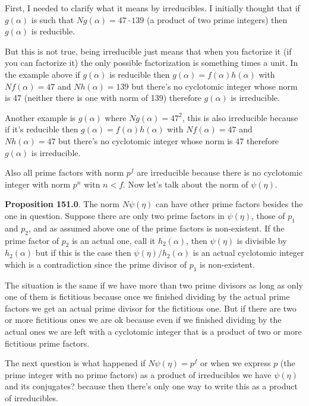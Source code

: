 \documentclass[aps,preprint,preprintnumbers,nofootinbib,showpacs,prd]{revtex4-1}
\begin{document}
First, I needed to clarify what it means by irreducibles. I initially thought that if $g(\alpha)$ is such that $Ng(\alpha) = 47 \cdot 139$ (a product of two prime integers) then $g(\alpha)$ is reducible.

But this is not true, being irreducible just means that when you factorize it (if you can factorize it) the only possible factorization is something times a unit. In the example above if $g(\alpha)$ is reducible then $g(\alpha) = f(\alpha)h(\alpha)$ with $Nf(\alpha) = 47$ and $Nh(\alpha) = 139$ but there's no cyclotomic integer whose norm is 47 (neither there is one with norm of 139) therefore $g(\alpha)$ is irreducible.

Another example is $g(\alpha)$ where $Ng(\alpha) = 47^2$, this is also irreducible because if it's reducible then $g(\alpha) = f(\alpha)h(\alpha)$ with $Nf(\alpha) = 47$ and $Nh(\alpha) = 47$ but there's no cyclotomic integer whose norm is 47 therefore $g(\alpha)$ is irreducible.

Also all prime factors with norm $p^f$ are irreducible because there is no cyclotomic integer with norm $p^n$ witn $n < f$. Now let's talk about the norm of $\psi(\eta)$.

{\bf Proposition 151.0}. The norm $N\psi(\eta)$ can have other prime factors besides the one in question. Suppose there are only two prime factors in $\psi(\eta)$, those of $p_1$ and $p_2$, and as assumed above one of the prime factors is non-existent. If the prime factor of $p_2$ is an actual one, call it $h_2(\alpha)$, then $\psi(\eta)$ is divisible by $h_2(\alpha)$ but if this is the case then $\psi(\eta)/h_2(\alpha)$ is an actual cyclotomic integer which is a contradiction since the prime divisor of $p_1$ is non-existent.

The situation is the same if we have more than two prime divisors as long as only one of them is fictitious because once we finished dividing by the actual prime factors we get an actual prime divisor for the fictitious one. But if there are two or more fictitious ones we are ok because even if we finished dividing by the actual ones we are left with a cyclotomic integer that is a product of two or more fictitious prime factors.

The next question is what happened if $N\psi(\eta) = p^f$ or when we express $p$ (the prime integer with no prime factors) as a product of irreducibles we have $\psi(\eta)$ and its conjugates? because then there's only one way to write this as a product of irreducibles.
\end{document}
